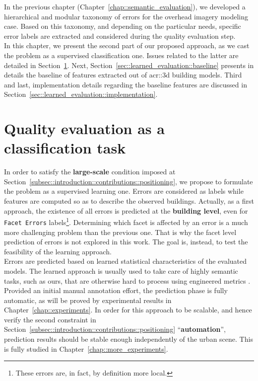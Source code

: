 \minitoc

\vfill

In the previous chapter (Chapter~\ref{chap::semantic_evaluation}), we developed a hierarchical and modular taxonomy of errors for the overhead imagery modeling case.
Based on this taxonomy, and depending on the particular needs, specific error labels are extracted and considered during the quality evaluation step.\\

In this chapter, we present the second part of our proposed approach, as we cast the problem as a supervised classification one.
Issues related to the latter are detailed in Section~\ref{sec::learned_evaluation::classification}.
Next, Section~\ref{sec::learned_evaluation::baseline} presents in details the baseline of features extracted out of \gls{acr::3d} building models.
Third and last, implementation details regarding the baseline features are discussed in Section~\ref{sec::learned_evaluation::implementation}.

\clearpage

\section{Quality evaluation as a classification task}
    \label{sec::learned_evaluation::classification}
    In order to satisfy the \textbf{large-scale} condition imposed at Section~\ref{subsec::introduction::contributions::positioning}, we propose to formulate the problem as a supervised learning one.
    Errors are considered as labels while features are computed so as to describe the observed buildings.
    Actually, as a first approach, the existence of all errors is predicted at the \textbf{building level}, even for \texttt{Facet Errors} labels\footnote{These errors are, in fact, by definition more local.}.
    Determining which facet is affected by an error is a much more challenging problem than the previous one.
    That is why the facet level prediction of errors is not explored in this work.
    The goal is, instead, to test the feasibility of the learning approach.\\

    Errors are predicted based on learned statistical characteristics of the evaluated models.
    The learned approach is usually used to take care of highly semantic tasks, such as ours, that are otherwise hard to process using engineered metrics \addref.\\
    Provided an initial manual annotation effort, the prediction phase is fully automatic, as will be proved by experimental results in Chapter~\ref{chap::experiments}.
    In order for this approach to be scalable, and hence verify the second constraint in Section~\ref{subsec::introduction::contributions::positioning} ``\textbf{automation}'', prediction results should be stable enough independently of the urban scene.
    This is fully studied in Chapter~\ref{chap::more_experiments}.\\

